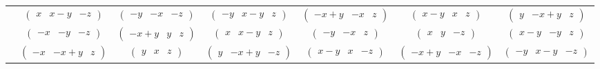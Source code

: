 \documentclass[fleqn,9pt,landscape]{jsarticle}
\begin{document}
\begin{center}
\begin{longtable}{ccccccc}
& $ \begin{pmatrix} x & x - y & - z \end{pmatrix} $ & $ \begin{pmatrix} - y & - x & - z \end{pmatrix} $ & $ \begin{pmatrix} - y & x - y & z \end{pmatrix} $ & $ \begin{pmatrix} - x + y & - x & z \end{pmatrix} $ & $ \begin{pmatrix} x - y & x & z \end{pmatrix} $ & $ \begin{pmatrix} y & - x + y & z \end{pmatrix} $ \\
& $ \begin{pmatrix} - x & - y & - z \end{pmatrix} $ & $ \begin{pmatrix} - x + y & y & z \end{pmatrix} $ & $ \begin{pmatrix} x & x - y & z \end{pmatrix} $ & $ \begin{pmatrix} - y & - x & z \end{pmatrix} $ & $ \begin{pmatrix} x & y & - z \end{pmatrix} $ & $ \begin{pmatrix} x - y & - y & z \end{pmatrix} $ \\
& $ \begin{pmatrix} - x & - x + y & z \end{pmatrix} $ & $ \begin{pmatrix} y & x & z \end{pmatrix} $ & $ \begin{pmatrix} y & - x + y & - z \end{pmatrix} $ & $ \begin{pmatrix} x - y & x & - z \end{pmatrix} $ & $ \begin{pmatrix} - x + y & - x & - z \end{pmatrix} $ & $ \begin{pmatrix} - y & x - y & - z \end{pmatrix} $ \\
\end{longtable}
\end{center}
\end{document}
